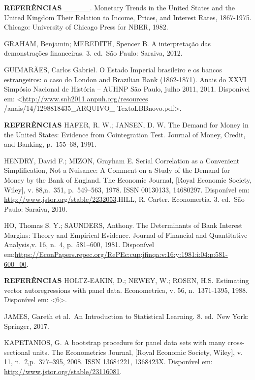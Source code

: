 \documentclass[
  ignorenonframetext,
  aspectratio=169,
  ignorenonframetext]{beamer}
\begin{document}
\begin{frame}{\textbf{REFERÊNCIAS}}
\protect\hypertarget{referuxeancias-14}{}
\_\_\_\_\_. Monetary Trends in the United States and the United Kingdom
Their Relation to Income, Prices, and Interest Rates, 1867-1975.
Chicago: University of Chicago Press for NBER, 1982.

GRAHAM, Benjamin; MEREDITH, Spencer B. A interpretação das demonstrações
financeiras. 3. ed.~São Paulo: Saraiva, 2012.

GUIMARÃES, Carlos Gabriel. O Estado Imperial brasileiro e os bancos
estrangeiros: o caso do London and Brazilian Bank (1862-1871). Anais do
XXVI Simpósio Nacional de História -- AUHNP São Paulo, julho 2011, 2011.
Disponível em: \textless{}\url{http://www.snh2011.anpuh.org/resources}
/anais/14/1298818435\_ARQUIVO\_ TextoLBBnovo.pdf\textgreater.
\end{frame}

\begin{frame}{\textbf{REFERÊNCIAS}}
\protect\hypertarget{referuxeancias-15}{}
HAFER, R. W.; JANSEN, D. W. The Demand for Money in the United States:
Evidence from Cointegration Test. Journal of Money, Credit, and Banking,
p.~155--68, 1991.

HENDRY, David F.; MIZON, Grayham E. Serial Correlation as a Convenient
Simplification, Not a Nuisance: A Comment on a Study of the Demand for
Money by the Bank of England. The Economic Journal, {[}Royal Economic
Society, Wiley{]}, v. 88,n.~351, p.~549--563, 1978. ISSN 00130133,
14680297. Disponível em: \url{http://www.jstor.org/stable/2232053}.HILL,
R. Carter. Economertia. 3. ed.~São Paulo: Saraiva, 2010.

HO, Thomas S. Y.; SAUNDERS, Anthony. The Determinants of Bank Interest
Margins: Theory and Empirical Evidence. Journal of Financial and
Quantitative Analysis,v. 16, n.~4, p.~581--600, 1981. Disponível
em:\url{https://EconPapers.repec.org/RePEc:cup:jfinqa:v:16:y:1981:i:04:p:581-600_00}.
\end{frame}

\begin{frame}{\textbf{REFERÊNCIAS}}
\protect\hypertarget{referuxeancias-16}{}
HOLTZ-EAKIN, D.; NEWEY, W.; ROSEN, H.S. Estimating vector
autoregressions with panel data. Econometrica, v. 56, n.~1371-1395,
1988. Disponível em: \textless6\textgreater.

JAMES, Gareth et al.~An Introduction to Statistical Learning. 8. ed.~New
York: Springer, 2017.

KAPETANIOS, G. A bootstrap procedure for panel data sets with many
cross-sectional units. The Econometrics Journal, {[}Royal Economic
Society, Wiley{]}, v. 11, n.~2,p.~377--395, 2008. ISSN 13684221,
1368423X. Disponível em: \url{http://www.jstor.org/stable/23116081}.
\end{frame}
\end{document}
